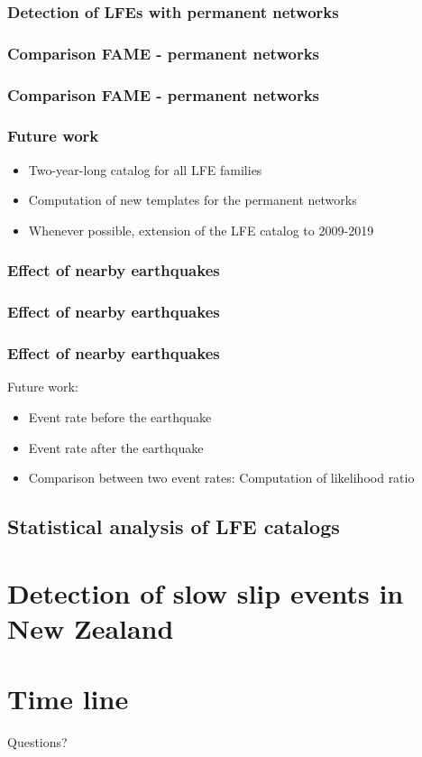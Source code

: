 \documentclass{beamer}
\begin{document}
	\begin{frame}
		\frametitle{Detection of LFEs with permanent networks}
	\end{frame}

	\begin{frame}
		\frametitle{Comparison FAME - permanent networks}
	\end{frame}

	\begin{frame}
		\frametitle{Comparison FAME - permanent networks}
	\end{frame}

	\begin{frame}
		\frametitle{Future work}
		\begin{itemize}
			\item Two-year-long catalog for all LFE families
			\item Computation of new templates for the permanent networks
			\item Whenever possible, extension of the LFE catalog to 2009-2019
		\end{itemize}
	\end{frame}

	\begin{frame}
		\frametitle{Effect of nearby earthquakes}
	\end{frame}

	\begin{frame}
		\frametitle{Effect of nearby earthquakes}
	\end{frame}

	\begin{frame}
		\frametitle{Effect of nearby earthquakes}
		Future work:
		\begin{itemize}
			\item Event rate before the earthquake
			\item Event rate after the earthquake
			\item Comparison between two event rates: Computation of likelihood ratio
		\end{itemize}
	\end{frame}

	\subsection{Statistical analysis of LFE catalogs}

	\section{Detection of slow slip events in New Zealand}

	\section{Time line}

	\begin{frame}
		\begin{Huge}
			\begin{center}
				Questions?
			\end{center}
		\end{Huge}
	\end{frame}
			
\end{document}
